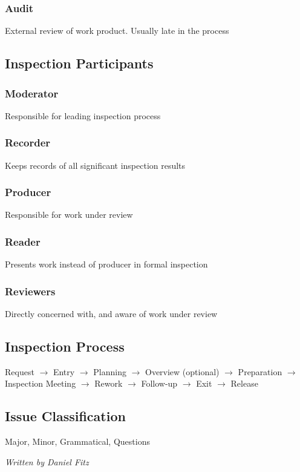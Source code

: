 \documentclass[10pt,a4paper]{article}
\begin{document}
\begin{landscape}
\begin{multicols}{3}
\subsubsection{Audit}
External review of work product. Usually late in the process
\subsection{Inspection Participants}
\subsubsection{Moderator}
Responsible for leading inspection process
\subsubsection{Recorder}
Keeps records of all significant inspection results
\subsubsection{Producer}
Responsible for work under review
\subsubsection{Reader}
Presents work instead of producer in formal inspection
\subsubsection{Reviewers}
Directly concerned with, and aware of work under review
\subsection{Inspection Process}
Request $\rightarrow$ Entry $\rightarrow$ Planning $\rightarrow$ Overview (optional) $\rightarrow$ Preparation $\rightarrow$ Inspection Meeting $\rightarrow$ Rework $\rightarrow$ Follow-up $\rightarrow$ Exit $\rightarrow$ Release
\subsection{Issue Classification}
Major, Minor, Grammatical, Questions

\vspace{1em}\textit{Written by Daniel Fitz}
\end{multicols}
\end{landscape}
\end{document}
